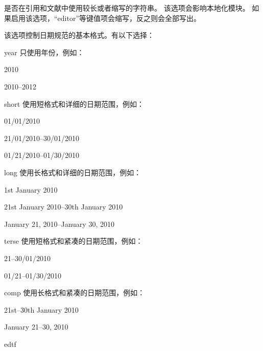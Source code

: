\begin{optionlist}
是否在引用和文献中使用较长或者缩写的字符串。
该选项会影响本地化模块。
如果启用该选项，“editor”等键值项会缩写，反之则会全部写出。



该选项控制日期规范的基本格式。有以下选择：

\begin{valuelist}
\item[year] %
只使用年份，例如：\par
2010\par
2010--2012\par
\item[short] %
使用短格式和详细的日期范围，例如：\par
01/01/2010\par
21/01/2010--30/01/2010\par
01/21/2010--01/30/2010
\item[long] %
使用长格式和详细的日期范围，例如：\par
1st January 2010\par
21st January 2010--30th January 2010\par
January 21, 2010--January 30, 2010\par
\item[terse] %
使用短格式和紧凑的日期范围，例如：\par
21--30/01/2010\par
01/21--01/30/2010
\item[comp] %
使用长格式和紧凑的日期范围，例如：\par
21st--30th January 2010\par
January 21--30, 2010\par
\item[edtf] %

\end{valuelist}
\end{optionlist}
